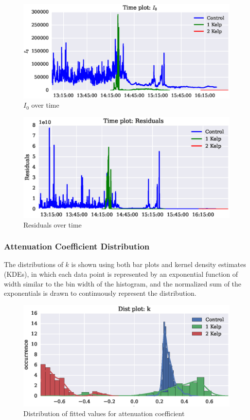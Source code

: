 \documentclass{article}
\newcommand\plotwidth{7in}
\begin{document}
\begin{figure}[H]
	\centering
	\includegraphics[width=\plotwidth]{plots/time_I0.eps}
	\caption{$I_0$ over time}
	\label{time_I0}
\end{figure}

\begin{figure}[H]
	\centering
	\includegraphics[width=\plotwidth]{plots/time_residuals.eps}
	\caption{Residuals over time}
	\label{time_residuals}
\end{figure}

\subsubsection{Attenuation Coefficient Distribution}
The distributions of $k$ is shown using both bar plots and kernel density estimates (KDEs), in which each data point is represented by an exponential function of width similar to the bin width of the histogram, and the normalized sum of the exponentials is drawn to continuously represent the distribution.

\begin{figure}[H]
	\centering
	\includegraphics[width=\plotwidth]{plots/dist_k.eps}
	\caption{Distribution of fitted values for attenuation coefficient}
\end{figure}
\end{document}
